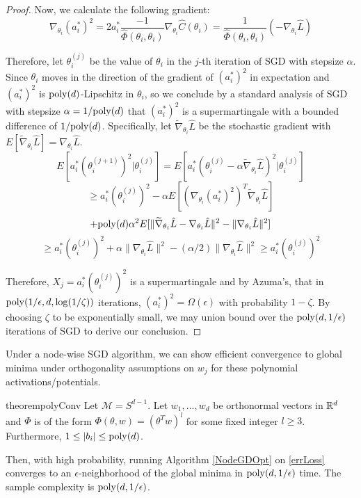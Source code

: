 \begin{proof}
Now, we calculate the following gradient: 
%
\begin{equation}
\nabla_{\theta_i} (a_i^*)^2 = 2a_i^*\frac{-1}{\widehat{\Phi}(\theta_i,\theta_i)} \nabla_{\theta_i} \widehat{C}(\theta_i) = \frac{1}{\widehat{\Phi}(\theta_i,\theta_i)} (-\nabla_{\theta_i} \widehat{L})
\end{equation}

Therefore, let $\theta_{i}^{(j)}$ be the value of $\theta_i$ in the $j$-th iteration of SGD with stepsize $\alpha$. Since $\theta_i$ moves in the direction of the gradient of $(a_i^*)^2$ in expectation and $(a_i^*)^2$ is $\mathrm{poly}(d)$-Lipschitz in $\theta_i$, so we conclude by a standard analysis of SGD with stepsize $\alpha = 1/\mathrm{poly}(d)$ that $(a_i^*)^2$ is a supermartingale with a bounded difference of $1/\mathrm{poly}(d)$. Specifically, let $\widetilde{\nabla}_{\theta_i}\hat{L}$ be the stochastic gradient with $E[\widetilde{\nabla}_{\theta_i}\hat{L}] = \nabla_{\theta_i}\hat{L}$.
%
\[E[a_i^*(\theta_i^{(j+1)})^2 | \theta_{i}^{(j)}] = E[a_i^*(\theta_i^{(j)} - \alpha \widetilde{\nabla}_{\theta_i} \hat{L})^2 |\theta_{i}^{(j)}] \]
\[\geq a_i^*(\theta_i^{(j)})^2 - \alpha E[(\nabla_{\theta_i}(a_i^*)^2)^T\widetilde{\nabla}_{\theta_i}\hat{L}]\]
%
\[+ \mathrm{poly}(d)\alpha^2E[\|\widetilde{\nabla}_{\theta_i}\hat{L} - \nabla_{\theta_i}\hat{L}\|^2 - \|\nabla_{\theta_i}\hat{L}\|^2]\]
%
\[\geq a_i^*(\theta_i^{(j)})^2 + \alpha \|\nabla_{\theta_i}\hat{L}\|^2 - (\alpha/2) \|\nabla_{\theta_i}\hat{L}\|^2 \geq a_i^*(\theta_i^{(j)})^2  \]

Therefore, $X_j = a_i^*(\theta_i^{(j)})^2$ is a supermartingale and by Azuma's, that in $\mathrm{poly}(1/\epsilon,d,\log(1/\zeta))$ iterations, $(a_i^*)^2 = \Omega(\epsilon)$ with probability $1-\zeta$. By choosing $\zeta$ to be exponentially small, we may union bound over the $\mathrm{poly}(d,1/\epsilon)$ iterations of SGD to derive our conclusion.
\end{proof}

%

Under a node-wise SGD algorithm, we can show efficient convergence to global minima under orthogonality assumptions on $w_j$ for these polynomial activations/potentials.

\begin{restatable}{theorem}{polyConv}
\label{PolyConv}
Let $\mathcal{M} = S^{d-1}$. Let $w_1,...,w_d$ be orthonormal vectors in ${\mathbb{R}}^d$ and $\Phi$ is of the form $\Phi(\theta,w) = (\theta^Tw)^l$ for some fixed integer $l \geq 3$. Furthermore, $1 \leq |b_i|\leq \mathrm{poly}(d)$. 

Then, with high probability, running Algorithm \ref{NodeGDOpt} on \eqref{errLoss} converges to an $\epsilon$-neighborhood of the global minima in $\mathrm{poly}(d,1/\epsilon)$ time. The sample complexity is $\mathrm{poly}(d,1/\epsilon)$.
\end{restatable}


